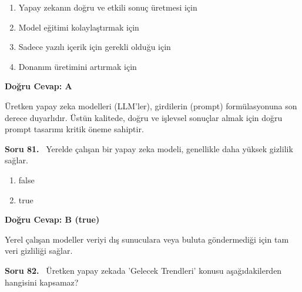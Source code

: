 \documentclass[11pt,a4paper,openany]{book}
\begin{document}
\begin{enumerate}[label=\Alph*), leftmargin=25pt, topsep=4pt, itemsep=2pt]
        \item Yapay zekanın doğru ve etkili sonuç üretmesi için
        \item Model eğitimi kolaylaştırmak için
        \item Sadece yazılı içerik için gerekli olduğu için
        \item Donanım üretimini artırmak için
\end{enumerate}

\vspace{4pt}
\begin{tcolorbox}[title=Cevap ve Açıklama, colback=gray!3!white, colframe=primarycolor!90!black, arc=2mm, fonttitle=\bfseries\sffamily, top=6pt, bottom=6pt]
    \textbf{Doğru Cevap: A}
    
    \vspace{2pt}
    Üretken yapay zeka modelleri (LLM'ler), girdilerin (prompt) formülasyonuna son derece duyarlıdır. Üstün kalitede, doğru ve işlevsel sonuçlar almak için doğru prompt tasarımı kritik öneme sahiptir.
\end{tcolorbox}
\vspace{10pt}
\needspace{5cm}
\vspace{8pt}
\noindent\textbf{\large\sffamily Soru 81.} \ Yerelde çalışan bir yapay zeka modeli, genellikle daha yüksek gizlilik sağlar.

\begin{enumerate}[label=\Alph*), leftmargin=25pt, topsep=4pt, itemsep=2pt]
        \item false
        \item true
\end{enumerate}

\vspace{4pt}
\begin{tcolorbox}[title=Cevap ve Açıklama, colback=gray!3!white, colframe=primarycolor!90!black, arc=2mm, fonttitle=\bfseries\sffamily, top=6pt, bottom=6pt]
    \textbf{Doğru Cevap: B (true)}
    
    \vspace{2pt}
    Yerel çalışan modeller veriyi dış sunuculara veya buluta göndermediği için tam veri gizliliği sağlar.
\end{tcolorbox}
\vspace{10pt}
\needspace{5cm}
\vspace{8pt}
\noindent\textbf{\large\sffamily Soru 82.} \ Üretken yapay zekada 'Gelecek Trendleri' konusu aşağıdakilerden hangisini kapsamaz?
\end{document}
